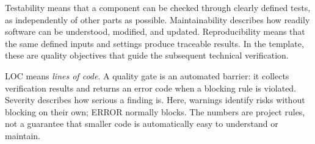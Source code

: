 \begin{beginnerstatement}

Testability means that a component can be checked through clearly defined
tests, as independently of other parts as possible. Maintainability describes
how readily software can be understood, modified, and updated. Reproducibility
means that the same defined inputs and settings produce traceable results. In
the template, these are quality objectives that guide the subsequent technical
verification.

LOC means \emph{lines of code}. A quality gate is an automated barrier: it
collects verification results and returns an error code when a blocking rule is
violated. Severity describes how serious a finding is. Here, warnings identify
risks without blocking on their own; ERROR normally blocks. The numbers are
project rules, not a guarantee that smaller code is automatically easy to
understand or maintain.

\end{beginnerstatement}
